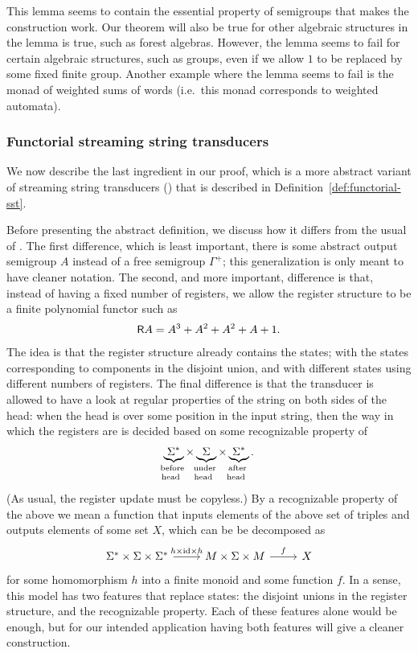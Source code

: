 This lemma seems to contain the essential property of semigroups that makes the construction work. Our theorem will also be true for other algebraic structures in the lemma is true, such as forest algebras. However, the lemma seems to fail for certain algebraic structures, such as groups, even if we allow $1$ to be replaced by some fixed finite group. Another example where the lemma seems to fail is the monad of weighted sums of words (i.e.~this monad corresponds to weighted automata).

\subsubsection{Functorial streaming string transducers}
\label{sec:functorial-sst}
We now describe the last ingredient in our proof, which is a more abstract variant  of streaming string transducers (\sst) that is described in Definition~\ref{def:functorial-sst}. 

Before presenting the abstract definition, we discuss how it differs  from the usual of \sst. The first difference, which is least important, there is some abstract output semigroup $A$ instead of a free semigroup $\Gamma^+$; this generalization is only meant to have cleaner notation. The second, and more important, difference is that, instead of having a fixed number of registers, we allow the register structure to be a finite polynomial functor such as 
\begin{align*}
\mathsf R A = A^3 + A^2 + A^2 + A + 1.
\end{align*}
The idea is that the register structure already contains the states; with the states corresponding to components in the disjoint union, and with  different states using different numbers of registers. The final difference is that the transducer is allowed to have a look at regular properties of the string on both sides of the head:  when the head is over some position in the input string, then the way in which the registers are is decided based on  some recognizable property of 
\begin{align*}
\myunderbrace{\Sigma^*}{before \\ head } \times 
\myunderbrace{\Sigma}{under \\ head } \times 
\myunderbrace{\Sigma^*}{after \\ head }.
\end{align*}
(As usual, the register update must be copyless.)
By a recognizable property of the above we mean a function that inputs elements of the above set of triples  and outputs elements of some set $X$, which can be be decomposed as 
\[
\begin{tikzcd}
    \Sigma^* \times \Sigma \times \Sigma^* 
    \ar[r,"h \times \id \times h"] 
    &
    M \times \Sigma \times M
\ar[r,"f"]
& 
X
\end{tikzcd}
\] 
for some homomorphism $h$ into a finite monoid and some function $f$. In a sense, this model has two features that replace states: the disjoint unions in the register structure, and the recognizable property. Each of these features alone would be enough, but for our intended application having both features will give a cleaner construction.

